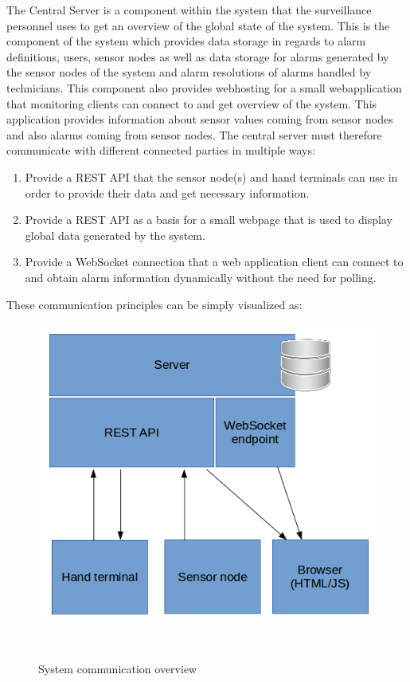 The Central Server is a component within the system that the surveillance personnel uses to get an overview of the global state of the system. This is the component of the system which provides data storage in regards to alarm definitions, users, sensor nodes as well as data storage for alarms generated by the sensor nodes of the system and alarm resolutions of alarms handled by technicians. This component also provides webhosting for a small webapplication that monitoring clients can connect to and get overview of the system. This application provides information about sensor values coming from sensor nodes and also alarms coming from sensor nodes. The central server must therefore communicate with different connected parties in multiple ways: \newline
\begin{enumerate}
  \item Provide a REST API that the sensor node(s) and hand terminals can use in order to provide their data and get necessary information.
  \item Provide a REST API as a basis for a small webpage that is used to display global data generated by the system.
  \item Provide a WebSocket connection that a web application client can connect to and obtain alarm information dynamically without the need for polling.
\end{enumerate}

These communication principles can be simply visualized as:


\begin{figure}[H]
\centering
\includegraphics[scale=0.6]{gfx/servercomm}
\caption{System communication overview}~\label{fig:servercomm}
\end{figure}


